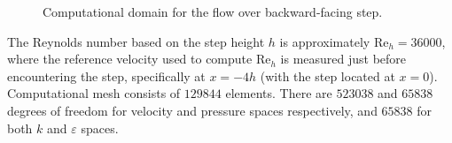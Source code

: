 \begin{figure}[htbp]
    \captionsetup{width=0.85\textwidth}
    \caption{Computational domain for the flow over backward-facing step.} 
    \label{fig: backward facing step}
\end{figure}

The Reynolds number based on the step height \(h\) is approximately \(\text{Re}_h = 36000\), where the reference velocity used to compute \(\text{Re}_h\) is measured just before encountering the step, specifically at \(x = -4h\) (with the step located at \(x=0\)). Computational mesh consists of \(129 844\) elements. There are \(523 038\) and \(65 838\) degrees of freedom for velocity and pressure spaces respectively, and \(65 838\) for both \(k\) and \(\varepsilon\) spaces. 

